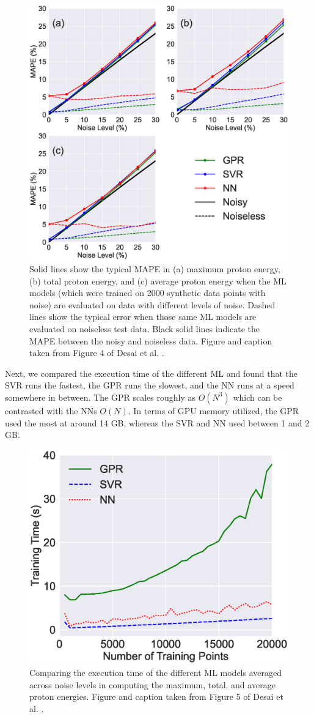 \begin{figure}
	\centering 
	\includegraphics[width=0.75\linewidth]{planning/images/paper1/test_mape_points=2.0k.eps}
	\caption{Solid lines show the typical \gls{MAPE} in (a) maximum proton energy, (b) total proton energy, and (c) average proton energy when the \gls{ML} models (which were trained on 2000 synthetic data points with noise) are evaluated on data with different levels of noise. Dashed lines show the typical error when those same ML models are evaluated on noiseless test data. Black solid lines indicate the \gls{MAPE} between the noisy and noiseless data. Figure and caption taken from Figure 4 of Desai et al. \cite{Desai_2024_CPP}.}
	\label{fig:mape_noise}
\end{figure}

Next, we compared the execution time of the different \gls{ML} and found that the \gls{SVR} runs the fastest, the \gls{GPR} runs the slowest, and the \gls{NN} runs at a speed somewhere in between. The \gls{GPR} scales roughly as $O(N^3)$ which can be contrasted with the \gls{NN}s $O(N)$. In terms of GPU memory utilized, the \gls{GPR} used the most at around 14 GB, whereas the \gls{SVR} and \gls{NN} used between 1 and 2 GB. 

\begin{figure}
	\centering 
	\includegraphics[width=0.6\linewidth]{planning/images/paper1/time.eps}
	\caption{Comparing the execution time of the different \gls{ML} models averaged across noise levels in computing the maximum, total, and average proton energies. Figure and caption taken from Figure 5 of Desai et al. \cite{Desai_2024_CPP}.}
	\label{fig:execution_time}
\end{figure}

